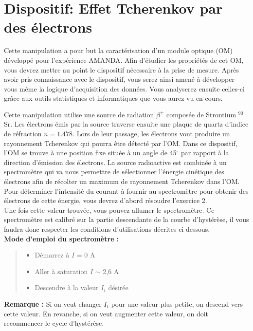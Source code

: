 \section{Dispositif: Effet Tcherenkov par des électrons}

Cette manipulation a pour but la caractérisation d'un module optique (OM) développé pour l'expérience AMANDA. Afin d'étudier les propriétés de cet OM, vous devrez mettre au point le dispositif nécessaire à la prise de mesure. Après avoir pris connaissance avec le dispositif, vous serez ainsi amené à développer vous même la logique d'acquisition des données. Vous analyserez ensuite celles-ci grâce aux outils statistiques et informatiques que vous aurez vu en cours. 

Cette manipulation utilise une source de radiation $\beta^+$ composée de Strontium $^{90}$Sr. Les électrons émis par la source traverse ensuite une plaque de quartz d'indice de réfraction  $n = 1.478$. Lors de leur passage, les électrons vont produire un rayonnement Tcherenkov qui pourra être détecté par l'OM. Dans ce dispositif, l'OM se trouve à une position fixe située à un angle de 45$^{\circ}$ par rapport à la direction d'émission des électrons. La source radioactive est combinée à un spectromètre qui va nous permettre de sélectionner l'énergie cinétique des électrons afin de récolter un maximum de rayonnement Tcherenkov dans l'OM. Pour déterminer l'intensité du courant à fournir au spectromètre pour obtenir des électrons de cette énergie, vous devrez d'abord résoudre l'exercice 2.\\

Une fois cette valeur trouvée, vous pouvez allumer le spectromètre. Ce spectromètre est calibré sur la partie descendante de la courbe d'hystérèse, il vous faudra donc respecter les conditions d'utilisations décrites ci-dessous.\\

\textbf{Mode d'emploi du spectromètre :}
\begin{quote}
    \begin{itemize}
        \item Démarrez à $I$ = 0 A
        \item Aller à saturation $I$ $\sim$ 2,6 A
        \item Descendre à la valeur $I_t$ désirée
    \end{itemize}
\end{quote}
\textbf{Remarque :} Si on veut changer $I_t$ pour une valeur plus petite, on descend vers cette valeur. En revanche, si on veut augmenter cette valeur, on doit recommencer le cycle d'hystérèse. 

